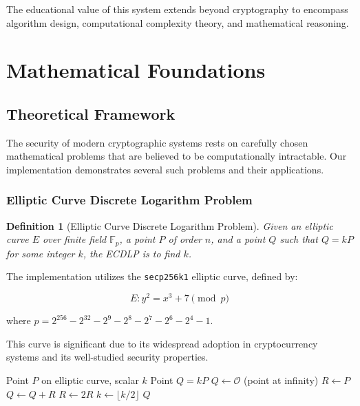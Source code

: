 \documentclass[12pt,a4paper]{article}
\newtheorem{definition}[theorem]{Definition}
\begin{document}
The educational value of this system extends beyond cryptography to encompass algorithm design, computational complexity theory, and mathematical reasoning.

\section{Mathematical Foundations}

\subsection{Theoretical Framework}

The security of modern cryptographic systems rests on carefully chosen mathematical problems that are believed to be computationally intractable. Our implementation demonstrates several such problems and their applications.

\subsubsection{Elliptic Curve Discrete Logarithm Problem}

\begin{definition}[Elliptic Curve Discrete Logarithm Problem]
Given an elliptic curve $E$ over finite field $\mathbb{F}_p$, a point $P$ of order $n$, and a point $Q$ such that $Q = kP$ for some integer $k$, the ECDLP is to find $k$.
\end{definition}

The implementation utilizes the \texttt{secp256k1} elliptic curve, defined by:

\begin{equation}
E: y^2 = x^3 + 7 \pmod{p}
\end{equation}

where $p = 2^{256} - 2^{32} - 2^9 - 2^8 - 2^7 - 2^6 - 2^4 - 1$.

This curve is significant due to its widespread adoption in cryptocurrency systems and its well-studied security properties.

\begin{algorithm}
\caption{Elliptic Curve Scalar Multiplication}
\begin{algorithmic}[1]
\REQUIRE Point $P$ on elliptic curve, scalar $k$
\ENSURE Point $Q = kP$
\STATE $Q \leftarrow \mathcal{O}$ (point at infinity)
\STATE $R \leftarrow P$
        \STATE $Q \leftarrow Q + R$
    \ENDIF
    \STATE $R \leftarrow 2R$
    \STATE $k \leftarrow \lfloor k/2 \rfloor$
\ENDWHILE
\RETURN $Q$
\end{algorithmic}
\end{algorithm}
\end{document}

